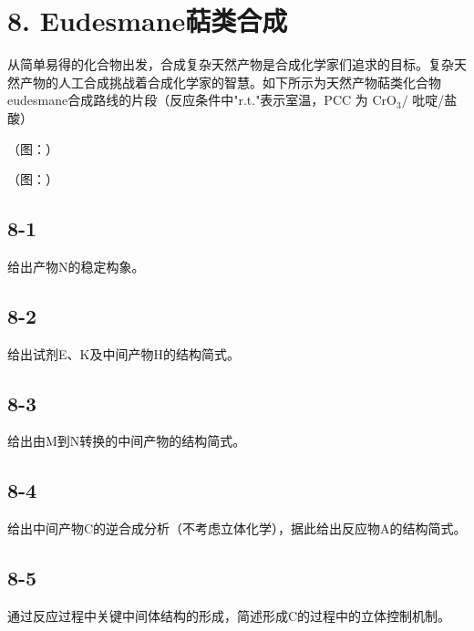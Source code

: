 \section*{8. Eudesmane萜类合成}
从简单易得的化合物出发，合成复杂天然产物是合成化学家们追求的⽬标。复杂天然产物的⼈⼯合成挑战着合成化学家的智慧。如下所⽰为天然产物萜类化合物eudesmane合成路线的⽚段（反应条件中"r.t."表⽰室温，PCC 为 $\mathrm { { C r O } _ { 3 } / }$ 吡啶/盐酸）

（图：）

（图：）

\subsection*{8-1}
给出产物N的稳定构象。

\subsection*{8-2}
给出试剂E、K及中间产物H的结构简式。

\subsection*{8-3}
给出由M到N转换的中间产物的结构简式。

\subsection*{8-4}
给出中间产物C的逆合成分析（不考虑⽴体化学），据此给出反应物A的结构简式。

\subsection*{8-5}
通过反应过程中关键中间体结构的形成，简述形成C的过程中的⽴体控制机制。
